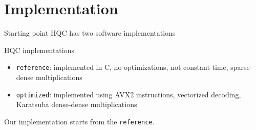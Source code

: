 \section{Implementation}
\begin{frame}
    \sectionpage
\end{frame}

\begin{frame}{Starting point}
    HQC has two software implementations
    \begin{block}{HQC implementations}
        \begin{itemize}
            \item \texttt{reference}: implemented in C, no optimizations, not constant-time, sparse-dense multiplications
            \item \texttt{optimized}: implemented using AVX2 instructions, vectorized decoding, Karatsuba dense-dense multiplications
        \end{itemize}
        Our implementation starts from the \texttt{reference}.
    \end{block}
\end{frame}


